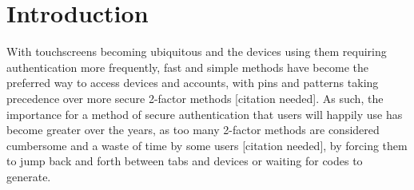 \documentclass{l4proj}
\begin{document}
\tableofcontents

%
%
%
%
%
%
%
%
\chapter{Introduction}


With touchscreens becoming ubiquitous and the devices using them requiring authentication more frequently, fast and simple methods have become the preferred way to access devices and accounts, with pins and patterns taking precedence over more secure 2-factor methods [citation needed]. As such, the importance for a method of secure authentication that users will happily use has become greater over the years, as too many 2-factor methods are considered cumbersome and a waste of time by some users [citation needed], by forcing them to jump back and forth between tabs and devices or waiting for codes to generate. 
\end{document}
